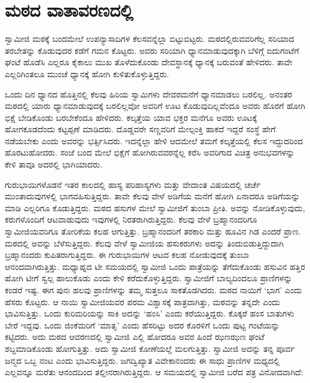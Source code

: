 
\chapter{ಮಠದ ವಾತಾವರಣದಲ್ಲಿ}

 ಸ್ವಾಮೀಜಿ ಮಠಕ್ಕೆ ಬಂದಮೇಲೆ ಉಪನ್ಯಾಸಾದಿಗಳ ಕೆಲಸವನ್ನೆಲ್ಲಾ ಬಿಟ್ಟುಬಿಟ್ಟರು. ಮಠದಲ್ಲಿರುವವರಿಗೆಲ್ಲ ಸರಿಯಾದ ತರಬೇತನ್ನು ಕೊಡುವುದರ ಕಡೆಗೆ ಗಮನ ಕೊಟ್ಟರು. ಅವರು ಸರಿಯಾಗಿ ಧ್ಯಾನಮಾಡುವುದಕ್ಕಾಗಿ ಬೆಳಿಗ್ಗೆ ಐದುಗಂಟೆಗೆ ಘಂಟೆ ಹೊಡೆಸಿ ಎಲ್ಲರೂ ಕೈಕಾಲು ಮುಖ ತೊಳೆದುಕೊಂಡು ದೇವಸ್ಥಾನಕ್ಕೆ ಧ್ಯಾನಕ್ಕೆ ಬರುವಂತೆ ಹೇಳಿದರು. ತಾವೇ ಎಲ್ಲರಿಗಿಂತಲೂ ಮುಂಚೆ ಧ್ಯಾನಕ್ಕೆ ಹೋಗಿ ಕುಳಿತುಕೊಳ್ಳುತ್ತಿದ್ದರು. 

 ಒಂದು ದಿನ ಧ್ಯಾನದ ಹೊತ್ತಿನಲ್ಲಿ ಕೆಲವು ಹಿರಿಯ ಸ್ವಾಮಿಗಳು ದೇವರಮನೆಗೆ ಧ್ಯಾನಮಾಡಲು ಬರಲಿಲ್ಲ. ಅನಂತರ ಮಠದಲ್ಲಿ ಯಾರು ಧ್ಯಾನಮಾಡುವುದಕ್ಕೆ ಬರಲಿಲ್ಲವೋ ಅವರಿಗೆ ಊಟ ಕೊಡುವುದಿಲ್ಲವೆಂದೂ ಅವರು ಹೊರಗೆ ಹೋಗಿ ಭಿಕ್ಷೆ ಬೇಡಿಕೊಂಡು ಬರಬೇಕೆಂದೂ ಹೇಳಿದರು. ಕಲ್ಕತ್ತೆಯ ಯಾವ ಭಕ್ತರ ಮನೆಗೂ ಅವರು ಊಟಕ್ಕೆ ಹೋಗಕೂಡದೆಂದು ಕಟ್ಟಪ್ಪಣೆ ಮಾಡಿದರು. ದೊಡ್ಡವರೇ ಸಣ್ಣವರಿಗೆ ಮೇಲ್ಪಂಕ್ತಿ ಹಾಕದೆ ಇದ್ದರೆ ಸಂಸ್ಥೆ ಹೇಗೆ ನಡೆಯಬೇಕು ಎಂದು ಅವರನ್ನು ಭರ್ತ್ಸಿಸಿದರು. ಇದನ್ನೆಲ್ಲಾ ಹೇಳಿ ಆದಮೇಲೆ ತಮಗೆ ಕಲ್ಕತ್ತೆಯಲ್ಲಿ ಕೆಲಸ ಇದ್ದುದರಿಂದ ಹೊರಟುಹೋದರು. ಸಂಜೆ ಬಂದ ಮೇಲೆ ಭಿಕ್ಷೆಗೆ ಹೋಗಿರುವವರನ್ನೆಲ್ಲ ಕರೆಸಿ ಅವರಿಗಾದ ವಿಚಿತ್ರ ಅನುಭವಗಳನ್ನು ಕೇಳಿ ತಾವೂ ಅದರಲ್ಲಿ ಭಾಗಿಯಾದರು. 

 ಗುರುಭಾಯಿಗಳೊಡನೆ ಇತರ ಕಾಲದಲ್ಲಿ ಹಾಸ್ಯ ಪರಿಹಾಸ್ಯಗಳು ಮತ್ತು ವೇದಾಂತ ವಿಷಯದಲ್ಲಿ ಚರ್ಚೆ ಮುಂತಾದುವುಗಳಲ್ಲಿ ಭಾಗವಹಿಸುತ್ತಿದ್ದರು. ತಾವೇ ಕೆಲವು ವೇಳೆ ಅಡಿಗೆಯ ಮನೆಗೆ ಹೋಗಿ ಏನಾದರೂ ಅಡಿಗೆಯನ್ನು ಮಾಡಿ ಎಲ್ಲರಿಗೂ ಕೊಡುತ್ತಿದ್ದರು. ಮಠದ ಹಸುಗಳ ಮೇಲೆ ಸ್ವಾಮೀಜಿಗೆ ತುಂಬಾ ಪ್ರೀತಿ. ಅವನ್ನು ನೋಡಿಕೊಳ್ಳುವುದು, ಕರುಗಳೊಂದಿಗೆ ಆಟವಾಡುವುದು ಇವುಗಳಲ್ಲಿ ನಿರತರಾಗಿರುತ್ತಿದ್ದರು. ಕೆಲವು ವೇಳೆ ಬ್ರಹ್ಮಾನಂದರಿಗೂ ಸ್ವಾಮೀಜಿಯವರಿಗೂ ತೋರಿಕೆಯ ಕಲಹ ಆಗುತ್ತಿತ್ತು. ಬ್ರಹ್ಮಾನಂದರಿಗೆ ತರಕಾರಿ ಮತ್ತು ಹೂವಿನ ಗಿಡ ಎಂದರೆ ಪ್ರಾಣ. ಮಠದಲ್ಲಿ ಅವನ್ನು ಬೆಳೆಸುತ್ತಿದ್ದರು. ಕೆಲವು ವೇಳೆ ಸ್ವಾಮೀಜಿಯ ಹಸುಕರುಗಳು ಅದನ್ನು ತಿಂದುಬಿಡುತ್ತಿದ್ದುದಾಗಿ ಬ್ರಹ್ಮಾನಂದರು ಕುಪಿತರಾಗುತ್ತಿದ್ದರು. ಈ ಗುರುಭಾಯಿಗಳ ಆಟದ ಕಲಹ ನೋಡುವುದಕ್ಕೆ ತುಂಬಾ ಆನಂದವಾಗಿರುತ್ತಿತ್ತು. ಮಧ್ಯಾಹ್ನದ ಟೀ ಸಮಯದಲ್ಲಿ ಸ್ವಾಮೀಜಿ ಒಂದು ಪಾತ್ರೆಯನ್ನು ತೆಗೆದುಕೊಂಡು ಹಸುವಿನ ಹತ್ತಿರ ಹೋಗಿ ಟೀಗೆ ಸ್ವಲ್ಪ ಹಾಲುಕೊಡು ಎಂದು ಕೇಳಿ ಕರೆದುಕೊಳ್ಳುತ್ತಿದ್ದರು. ಸ್ವಾಮೀಜಿಗೆ ಬಾಲ್ಯದಿಂದಲೂ ಪ್ರಾಣಿಗಳನ್ನು ಕಂಡರೆ ಇಷ್ಟ. ಈಗ ಪುನಃ ಹಲವು ಪ್ರಾಣಿಗಳನ್ನು ತಮ್ಮ ಸುತ್ತಲೂ ಸಾಕತೊಡಗಿದರು. ಮಠದ ನಾಯಿಗೆ ‘ಭಾಗ’ ಎಂದು ಹೆಸರು ಕೊಟ್ಟರು. ಆ ನಾಯಿ ಸ್ವಾಮೀಜಿಯವರ ಪರಮ ವಿಶ್ವಾಸಕ್ಕೆ ಪಾತ್ರವಾಗಿತ್ತು, ಮಠವನ್ನು ತನ್ನದೇ ಎಂದು ಭಾವಿಸುತ್ತಿತ್ತು. ಒಂದು ಕುರಿಮರಿಯನ್ನು ಸಾಕಿ ಅದನ್ನು ‘ಹಂಸಿ’ ಎಂದು ಕರೆಯುತ್ತಿದ್ದರು. ಕೊಕ್ಕರೆ ಹಂಸ ಬಾತುಗಳು ಬೇರೆ ಇದ್ದವು. ಒಂದು ಜಿಂಕೆಮರಿಗೆ ‘ಮಾತೃ’ ಎಂದು ಹೆಸರಿಟ್ಟು ಅದರ ಕೊರಳಿಗೆ ಒಂದು ಪುಟ್ಟ ಗಂಟೆಯನ್ನು ಕಟ್ಟಿದರು. ಅದು ಮಠದ ಆವರಣದಲ್ಲಿ ಸ್ವಾಮೀಜಿ ಎಲ್ಲಿ ಹೋದರೂ ಅವರ ಹಿಂದೆ ಝಣಝಣ ಘಂಟೆ ಶಬ್ದಮಾಡಿಕೊಂಡು ಹೋಗುತ್ತಿತ್ತು. ಅದು ಸ್ವಾಮೀಜಿ ಕೋಣೆಯಲ್ಲೆ ಮಲಗುತ್ತಿತ್ತು. ಸ್ವಾಮೀಜಿ ಅದನ್ನು ತನ್ನ ಪೂರ್ವ ಜನ್ಮದ ಒಬ್ಬ ನಂಟ ಎಂದು ಭಾವಿಸುತ್ತಿದ್ದರು. ಜಗದ್ವಿಖ್ಯಾತ ವಿವೇಕಾನಂದರು ಈ ಸಾಧು ಪ್ರಾಣಿಗಳ ಮಧ್ಯದಲ್ಲಿ ಎಲ್ಲವನ್ನೂ ಮರೆತು ಆನಂದದಿಂದ ತಲ್ಲೀನರಾಗಿರುತ್ತಿದ್ದರು. ಆ ಸಮಯದಲ್ಲಿ ಸ್ವಾಮೀಜಿ ಬರೆದ ಪತ್ರ ವಿನೋದವಾಗಿದೆ: 

